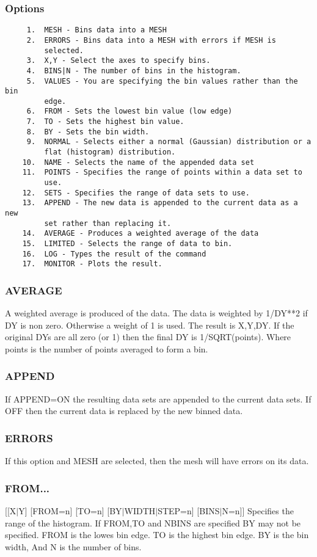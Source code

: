 \subsubsection{Options}
\begin{verbatim}
     1.  MESH - Bins data into a MESH 
     2.  ERRORS - Bins data into a MESH with errors if MESH is
         selected.  
     3.  X,Y - Select the axes to specify bins.  
     4.  BINS|N - The number of bins in the histogram.  
     5.  VALUES - You are specifying the bin values rather than the bin
         edge.  
     6.  FROM - Sets the lowest bin value (low edge) 
     7.  TO - Sets the highest bin value.  
     8.  BY - Sets the bin width.  
     9.  NORMAL - Selects either a normal (Gaussian) distribution or a
         flat (histogram) distribution.  
    10.  NAME - Selects the name of the appended data set 
    11.  POINTS - Specifies the range of points within a data set to
         use.  
    12.  SETS - Specifies the range of data sets to use.  
    13.  APPEND - The new data is appended to the current data as a new
         set rather than replacing it.  
    14.  AVERAGE - Produces a weighted average of the data 
    15.  LIMITED - Selects the range of data to bin.  
    16.  LOG - Types the result of the command 
    17.  MONITOR - Plots the result.  
\end{verbatim}

\subsubsection{AVERAGE}
A  weighted  average  is produced of the data.  The data is weighted by
1/DY**2 if DY is non zero.  Otherwise a  weight  of  1  is  used.   The
result  is  X,Y,DY.   If  the original DYs are all zero (or 1) then the
final DY is 1/SQRT(points).  Where  points  is  the  number  of  points
averaged to form a bin.  
\subsubsection{APPEND}
If  APPEND=ON  the resulting data sets are appended to the current data
sets.  If OFF then the current data is replaced by the new binned data. 
\subsubsection{ERRORS}
If this option and MESH are selected, then the mesh will have errors on
its data.  
\subsubsection{FROM...}
[[X$|$Y] [FROM=n] [TO=n] [BY$|$WIDTH$|$STEP=n] [BINS$|$N=n]] 
Specifies  the  range  of  the  histogram.   If  FROM,TO  and NBINS are
specified BY may not be specified.  FROM is the lowes bin edge.  TO  is
the  highest  bin  edge.   BY  is the bin width, And N is the number of
bins.  

